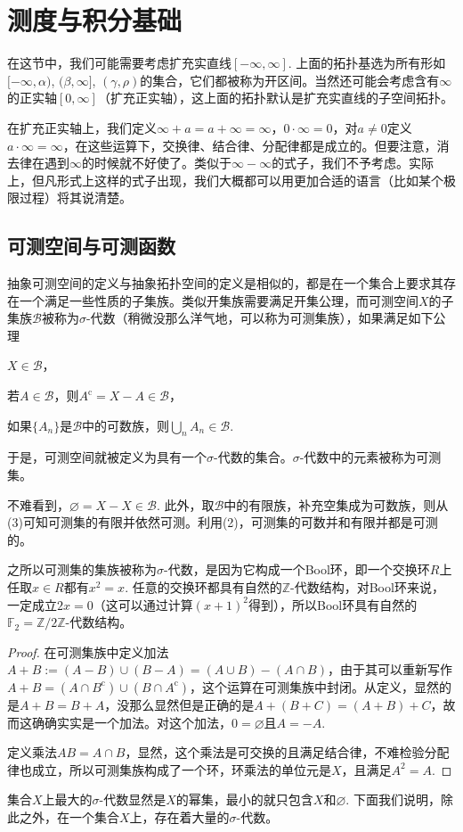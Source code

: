 \chapter{测度与积分基础}

在这节中，我们可能需要考虑扩充实直线$[-\infty,\infty]$. 上面的拓扑基选为所有形如$[-\infty,\alpha)$, $(\beta,\infty]$, $(\gamma,\rho)$的集合，它们都被称为开区间。当然还可能会考虑含有$\infty$的正实轴$[0,\infty]$（扩充正实轴），这上面的拓扑默认是扩充实直线的子空间拓扑。

在扩充正实轴上，我们定义$\infty+a=a+\infty=\infty$，$0\cdot \infty=0$，对$a\neq 0$定义$a\cdot \infty=\infty$，在这些运算下，交换律、结合律、分配律都是成立的。但要注意，消去律在遇到$\infty$的时候就不好使了。类似于$\infty-\infty$的式子，我们不予考虑。实际上，但凡形式上这样的式子出现，我们大概都可以用更加合适的语言（比如某个极限过程）将其说清楚。

\section{可测空间与可测函数}

\begin{para}
抽象可测空间的定义与抽象拓扑空间的定义是相似的，都是在一个集合上要求其存在一个满足一些性质的子集族。类似开集族需要满足开集公理，而可测空间$X$的子集族$\mathcal{B}$被称为$\sigma$-代数（稍微没那么洋气地，可以称为可测集族），如果满足如下公理
\begin{compactenum}[~~~~(1)]
\item $X\in \mathcal{B}$，
\item 若$A\in \mathcal{B}$，则$A^\text{c}=X-A\in \mathcal{B}$，
\item 如果$\{A_n\}$是$\mathcal{B}$中的可数族，则$\bigcup_n A_n\in \mathcal{B}$.
\end{compactenum}
于是，可测空间就被定义为具有一个$\sigma$-代数的集合。$\sigma$-代数中的元素被称为可测集。

不难看到，$\varnothing=X-X\in \mathcal{B}$. 此外，取$\mathcal{B}$中的有限族，补充空集成为可数族，则从(3)可知可测集的有限并依然可测。利用(2)，可测集的可数并和有限并都是可测的。

之所以可测集的集族被称为$\sigma$-代数，是因为它构成一个Bool环，即一个交换环$R$上任取$x\in R$都有$x^2=x$. 任意的交换环都具有自然的$\mathbb{Z}$-代数结构，对Bool环来说，一定成立$2x=0$（这可以通过计算$(x+1)^2$得到），所以Bool环具有自然的$\mathbb{F}_2=\mathbb{Z}/2\mathbb{Z}$-代数结构。

\begin{proof}
在可测集族中定义加法$A+B:=(A-B)\cup (B-A)=(A\cup B)-(A\cap B)$，由于其可以重新写作$A+B=(A\cap B^\text{c})\cup (B\cap A^\text{c})$，这个运算在可测集族中封闭。从定义，显然的是$A+B=B+A$，没那么显然但是正确的是$A+(B+C)=(A+B)+C$，故而这确确实实是一个加法。对这个加法，$0=\varnothing$且$A=-A$. 

定义乘法$AB=A\cap B$，显然，这个乘法是可交换的且满足结合律，不难检验分配律也成立，所以可测集族构成了一个环，环乘法的单位元是$X$，且满足$A^2=A$.
\end{proof}

集合$X$上最大的$\sigma$-代数显然是$X$的幂集，最小的就只包含$X$和$\varnothing$. 下面我们说明，除此之外，在一个集合$X$上，存在着大量的$\sigma$-代数。
\end{para}

